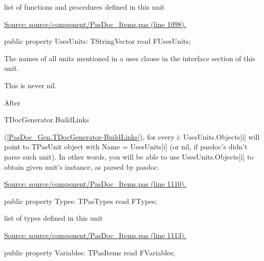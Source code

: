 \documentclass{report}
\newif\ifpdf
\begin{document}
\begin{list}{}
\begin{flushleft}
\ifpdf
\end{flushleft}
\fi


\par list of functions and procedures defined in this unit\par
\href{https://github.com/pasdoc/pasdoc/blob/master/source/component/PasDoc_Items.pas#L1098}{Source: source/component/PasDoc{\_}Items.pas (line 1098).}\label{PasDoc_Items.TPasUnit-UsesUnits}
\item[\textbf{UsesUnits}\hfill]
\ifpdf
\begin{flushleft}
\fi
\begin{ttfamily}
public property UsesUnits: TStringVector read FUsesUnits;\end{ttfamily}

\ifpdf
\end{flushleft}
\fi


\par The names of all units mentioned in a uses clause in the interface section of this unit.

This is never nil.

After \begin{ttfamily}TDocGenerator.BuildLinks\end{ttfamily}(\ref{PasDoc_Gen.TDocGenerator-BuildLinks}), for every i: UsesUnits.Objects[i] will point to TPasUnit object with Name = UsesUnits[i] (or nil, if pasdoc's didn't parse such unit). In other words, you will be able to use UsesUnits.Objects[i] to obtain given unit's instance, as parsed by pasdoc.\par
\href{https://github.com/pasdoc/pasdoc/blob/master/source/component/PasDoc_Items.pas#L1110}{Source: source/component/PasDoc{\_}Items.pas (line 1110).}\label{PasDoc_Items.TPasUnit-Types}
\item[\textbf{Types}\hfill]
\ifpdf
\begin{flushleft}
\fi
\begin{ttfamily}
public property Types: TPasTypes read FTypes;\end{ttfamily}

\ifpdf
\end{flushleft}
\fi


\par list of types defined in this unit\par
\href{https://github.com/pasdoc/pasdoc/blob/master/source/component/PasDoc_Items.pas#L1113}{Source: source/component/PasDoc{\_}Items.pas (line 1113).}\label{PasDoc_Items.TPasUnit-Variables}
\item[\textbf{Variables}\hfill]
\ifpdf
\begin{flushleft}
\fi
\begin{ttfamily}
public property Variables: TPasItems read FVariables;\end{ttfamily}


\end{flushleft}
\end{list}
\end{document}
